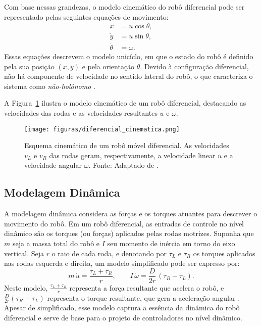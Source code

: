 Com base nessas grandezas, o modelo cinemático do robô diferencial pode ser representado pelas seguintes equações de movimento:
\begin{align}
    \dot{x} &= u \cos\theta, \\
    \dot{y} &= u \sin\theta, \\
    \dot{\theta} &= \omega.
\end{align}
Essas equações descrevem o modelo unicíclo, em que o estado do robô é definido pela sua posição $(x, y)$ e pela orientação $\theta$. Devido à configuração diferencial, não há componente de velocidade no sentido lateral do robô, o que caracteriza o sistema como \textit{não-holônomo} \cite{book:siegwart2011}.

A Figura~\ref{fig:diferencial_cinematica} ilustra o modelo cinemático de um robô diferencial, destacando as velocidades das rodas e as velocidades resultantes $u$ e $\omega$.

\begin{figure}[htb]
    \centering
    \texttt{[image: figuras/diferencial\_cinematica.png]}
    \caption{Esquema cinemático de um robô móvel diferencial. As velocidades $v_L$ e $v_R$ das rodas geram, respectivamente, a velocidade linear $u$ e a velocidade angular $\omega$. Fonte: Adaptado de \cite{Sarcinelli-Filho2023_2}.}
    \label{fig:diferencial_cinematica}
\end{figure}

\subsection{Modelagem Dinâmica}
A modelagem dinâmica considera as forças e os torques atuantes para descrever o movimento do robô. Em um robô diferencial, as entradas de controle no nível dinâmico são os torques (ou forças) aplicados pelas rodas motrizes. Suponha que $m$ seja a massa total do robô e $I$ seu momento de inércia em torno do eixo vertical. Seja $r$ o raio de cada roda, e denotando por $\tau_L$ e $\tau_R$ os torques aplicados nas rodas esquerda e direita, um modelo simplificado pode ser expresso por:
\begin{equation}\label{eq:dinamica}
    m\,\dot{u} = \frac{\tau_L + \tau_R}{r}, \qquad
    I\,\dot{\omega} = \frac{D}{2r}\,(\tau_R - \tau_L).
\end{equation}
Neste modelo, $\frac{\tau_L + \tau_R}{r}$ representa a força resultante que acelera o robô, e $\frac{D}{2r}(\tau_R - \tau_L)$ representa o torque resultante, que gera a aceleração angular \cite{Martins2008}. Apesar de simplificado, esse modelo captura a essência da dinâmica do robô diferencial e serve de base para o projeto de controladores no nível dinâmico.


